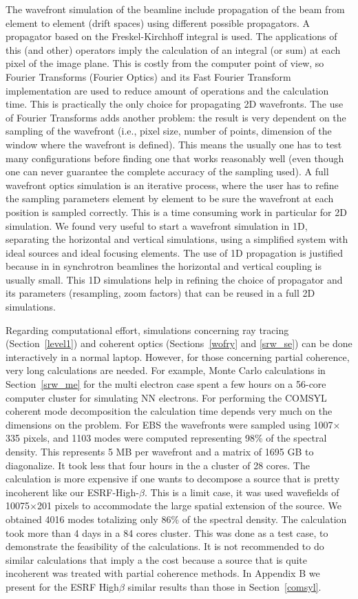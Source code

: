 \documentclass{iucr}              %
\newcommand{\inred}[1]{{\color{red}#1}}
\begin{document}
The wavefront simulation of the beamline include propagation of the beam from element to element (drift spaces) using different possible propagators. A propagator based on the Freskel-Kirchhoff integral is used. The applications of this (and other) operators imply the calculation of an integral (or sum) at each pixel of the image plane. This is costly from the computer point of view, so Fourier Transforms (Fourier Optics) and its Fast Fourier Transform implementation are used to reduce amount of operations and the calculation time. This is practically the only choice for propagating 2D wavefronts. The use of Fourier Transforms adds another problem: the result is very dependent on the sampling of the wavefront (i.e., pixel size, number of points, dimension of the window where the wavefront is defined). This means the usually one has to test many configurations before finding one that works reasonably well (even though one can never guarantee the complete accuracy of the sampling used). A full wavefront optics simulation is an iterative process, where the user has to refine the sampling parameters element by element to be sure the wavefront at each position is sampled correctly. This is a time consuming work in particular for 2D simulation. We found very useful to start a wavefront simulation in 1D, separating the horizontal and vertical simulations, using a simplified system with ideal sources and ideal focusing elements. The use of 1D propagation is justified because in in synchrotron beamlines the horizontal and vertical coupling is usually small. This 1D simulations help in refining the choice of propagator and its parameters (resampling, zoom factors) that can be reused in a full 2D simulations.

Regarding computational effort, simulations concerning ray tracing (Section~\ref{level1}) and coherent optics (Sections~\ref{wofry} and \ref{srw_se}) can be done interactively in a normal laptop. However, for those concerning partial coherence, very long calculations are needed. For example, Monte Carlo calculations in Section~\ref{srw_me} for the multi electron case spent a few hours on a 56-core computer cluster for simulating \inred{NN} electrons. For performing the COMSYL coherent mode decomposition the calculation time depends very much on the dimensions on the problem. For EBS the wavefronts were sampled using 1007$\times$335 pixels, and 1103 modes were computed representing 98\% of the spectral density. This represents 5 MB per wavefront and a matrix of 1695 GB to diagonalize. It took less that four hours in the a cluster of 28 cores. The calculation is more expensive if one wants to decompose a source that is pretty incoherent like our ESRF-High-$\beta$. This is a limit case, it was used wavefields of 10075$\times$201 pixels to accommodate the large spatial extension of the source. We obtained 4016 modes totalizing only 86\% of the spectral density.  The calculation took more than 4 days in a 84 cores cluster. This was done as a test case, to demonstrate the feasibility of the calculations. It is not recommended to do similar calculations that imply a the cost because a source that is quite incoherent was treated with partial coherence methods. \inred{In Appendix B we present for the ESRF High$\beta$ similar results than those in Section~\ref{comsyl}}. 
\end{document}
